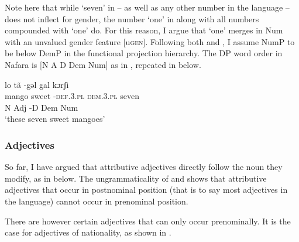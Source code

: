 \documentclass[output=paper]{langscibook}
\begin{document}
Note here that while ‘seven’ in  – as well as any other number in the language – does not inflect for gender, the number ‘one’ in  along with all numbers compounded with ‘one’ do. For this reason, I argue that ‘one’ merges in Num with an unvalued gender feature [u\textsc{gen}]. Following both \citet{Greenberg1963} and \citet{Cinque2005}, I assume NumP to be below DemP in the functional projection hierarchy. The DP word order in Nafara is [N A D Dem Num] as in , repeated in  below.

 
\ea\label{ex:baron:8}
\glll lo  tã -gəl  gal  kɔrʃi\\
mango sweet -\textsc{def.3.pl} \textsc{dem.3.pl} seven\\
N  Adj  -D  Dem  Num\\
\glt ‘these seven sweet mangoes’
\z


\subsubsection{Adjectives}
\label{sec:baron:2.1.5}
So far, I have argued that attributive adjectives directly follow the noun they modify, as in  below. The ungrammaticality of  and  shows that attributive adjectives that occur in postnominal position (that is to say most adjectives in the language) cannot occur in prenominal position.
 
\ea\label{ex:baron:9}
 

\z
\z

There are however certain adjectives that can only occur prenominally. It is the case for adjectives of nationality, as shown in .
\end{document}
